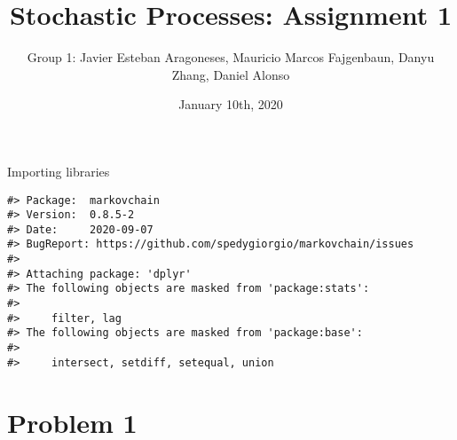 \documentclass[]{article}
\title{Stochastic Processes: Assignment 1}
\author{Group 1: Javier Esteban Aragoneses, Mauricio Marcos Fajgenbaun, Danyu
Zhang, Daniel Alonso}
\date{January 10th, 2020}
\begin{document}
\maketitle

Importing libraries

\begin{verbatim}
#> Package:  markovchain
#> Version:  0.8.5-2
#> Date:     2020-09-07
#> BugReport: https://github.com/spedygiorgio/markovchain/issues
#> 
#> Attaching package: 'dplyr'
#> The following objects are masked from 'package:stats':
#> 
#>     filter, lag
#> The following objects are masked from 'package:base':
#> 
#>     intersect, setdiff, setequal, union
\end{verbatim}

\hypertarget{problem-1}{%
\section{Problem 1}\label{problem-1}}
\end{document}
